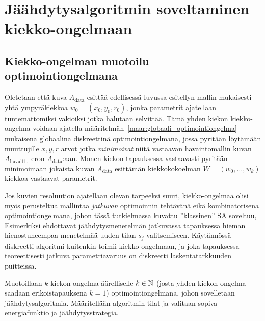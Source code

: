 \chapter{Jäähdytysalgoritmin soveltaminen kiekko-ongelmaan}
\label{cha:algoritmin_soveltaminen}

\section{Kiekko-ongelman muotoilu optimointiongelmana}
\label{sec:kiekko_ongelman_muotoilu_optimointiongelmana}

Oletetaan että kuva $A_\text{data}$ esittää edellisessä luvussa esitellyn mallin mukaisesti yhtä ympyräkiekkoa $w_0 = (x_0, y_0, r_0)$,
jonka parametrit ajatellaan tuntemattomiksi vakioiksi jotka halutaan selvittää.
Tämä yhden kiekon kiekko-ongelma voidaan ajatella määritelmän~\ref{maar:globaali_optimointiongelma} mukaisena globaalina diskreettinä optimointiongelmana,
jossa pyritään löytämään muuttujille $x, y, r$ arvot jotka \emph{minimoivat} niitä vastaavan havaintomallin kuvan $A_\text{havaittu}$ eron $A_{\text{data}}$:aan.
Monen kiekon tapauksessa vastaavasti pyritään minimoimaan jokaista kuvan $A_{\text{data}}$ esittämän kiekkokokoelman $W = (w_0, \dots, w_k)$ kiekkoa vastaavat parametrit.

Jos kuvien resoluution ajatellaan olevan tarpeeksi suuri,
kiekko-ongelmaa olisi myös perusteltua mallintaa \emph{jatkuvan} optimoinnin tehtävänä eikä kombinatorisena optimointiongelmana,
johon tässä tutkielmassa kuvattu ''klassinen'' SA soveltuu,
Esimerkiksi \textcite{recipes07} ehdottavat jäähdytysmenetelmän jatkuvassa tapauksessa hieman hienostuneempaa menetelmää uuden tilan $s_j$ valitsemiseen.
Käytännössä diskreetti algoritmi kuitenkin toimii kiekko-ongelmaan,
ja joka tapauksessa teoreettisesti jatkuva parametriavaruus on diskreetti laskentatarkkuuden puitteissa.

Muotoillaan $k$ kiekon ongelma äärelliselle $k \in \mathbb{N}$ (josta yhden kiekon ongelma saadaan erikoistapauksena $k=1$) optimointiongelmana,
johon sovelletaan jäähdytysalgoritmia.
Määritellään algoritmin tilat ja valitaan sopiva energiafunktio ja jäähdytysstrategia.


